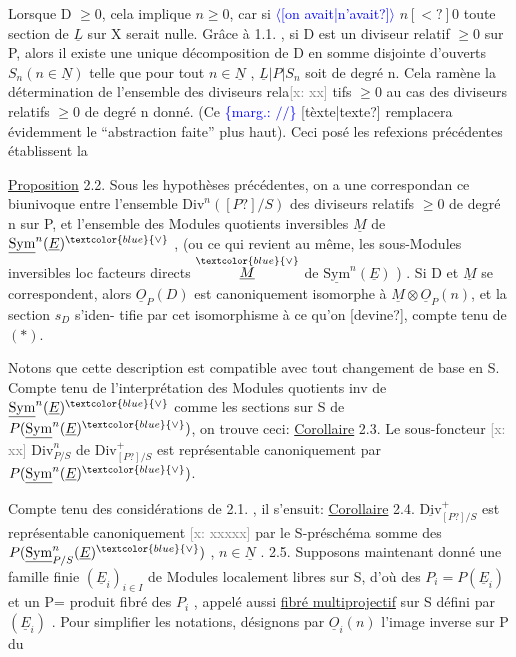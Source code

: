 \documentclass[11pt]{article}
\newcommand{\scanpage}[1]{\par\bigskip\noindent{\small\sffamily[scan #1]}\par}
\newcommand{\mspage}[1]{{\small\sffamily[p.\,#1]}}
\newcommand{\hand}[1]{\textcolor{blue}{#1}}
\newcommand{\inserted}[2][]{\textcolor{blue}{$\langle$#2$\rangle$}}
\newcommand{\margin}[1]{\textcolor{blue}{\{\textsf{marg.:} #1\}}}
\newcommand{\xout}[1]{\textcolor{gray}{[\textsf{x:} #1]}}
\newcommand{\uline}[1]{\underline{#1}}
\newcommand{\unsure}[1]{[#1?]}
\begin{document}
\mspage{106}

\clearpage
\scanpage{25/107}
\mspage{10}

Lorsque D $\geq 0$, cela implique $n \geq 0$, car si \inserted{\unsure{on avait|n'avait}} $n \unsure{<} 0$ toute section de
$\underline{L}$ sur X serait nulle. Grâce à 1.1. , si D est un diviseur relatif
$\geq 0$ sur P, alors il existe une unique décomposition de D en somme
disjointe d'ouverts $S_n (n \in \underline{N})$ telle que pour tout $n \in \underline{N}$ , $\underline{L}|P|S_n$ soit de
degré n. Cela ramène la détermination de l'ensemble des diviseurs rela\xout{xx}%
tifs $\geq 0$ au cas des diviseurs relatifs $\geq 0$ de degré n donné. (Ce
\margin{$/\!/$} \unsure{tèxte|texte} remplacera évidemment le ``abstraction faite'' plus haut). Ceci posé
les refexions précédentes établissent la

\uline{Proposition} 2.2. Sous les hypothèses précédentes, on a une correspondan%
ce biunivoque entre l'ensemble $\mathrm{Div}^{n}(\unsure{P}/S)$ des diviseurs relatifs $\geq 0$ de
degré n sur P, et l'ensemble des Modules quotients inversibles $\underline{M}$ de
$\underline{\mathrm{Sym}}^{n}(\underline{E})^{\hand{\vee}}$ , (ou ce qui revient au même, les sous-Modules inversibles loc
facteurs directs $\overset{\hand{\vee}}{\underline{M}}$ de $\underline{\mathrm{Sym}}^{n}(\underline{E})$ ) . Si D et $\underline{M}$ se correspondent, alors
$\underline{O}_P(D)$ est canoniquement isomorphe à $\underline{M}\otimes\underline{O}_P(n)$, et la section $s_D$ s'iden-%
tifie par cet isomorphisme à ce qu'on \unsure{devine}, compte tenu de $(*)$.

Notons que cette description est compatible avec tout changement de
base en S. Compte tenu de l'interprétation des Modules quotients inv de
$\underline{\mathrm{Sym}}^{n}(\underline{E})^{\hand{\vee}}$ comme les sections sur S de $P(\underline{\mathrm{Sym}}^{n}(\underline{E})^{\hand{\vee}})$, on trouve ceci:
\uline{Corollaire} 2.3. Le sous-foncteur \xout{xx} $\mathrm{Div}^{n}_{P/S}$ de $\mathrm{Div}^{+}_{\unsure{P}/S}$ est représentable
canoniquement par $P(\underline{\mathrm{Sym}}^{n}(\underline{E})^{\hand{\vee}})$.

Compte tenu des considérations de 2.1. , il s'ensuit:
\uline{Corollaire} 2.4. $\underline{\mathrm{Div}}^{+}_{\unsure{P}/S}$ est représentable canoniquement \xout{xxxxx} par
le S-préschéma somme des $P(\underline{\mathrm{Sym}}^{n}_{P/S}(\underline{E})^{\hand{\vee}})$ , $n \in \underline{N}$ .
2.5. Supposons maintenant donné une famille finie $(\underline{E}_i)_{i \in I}$ de Modules
localement libres sur S, d'où des $P_i = P(\underline{E}_i)$ et un P= produit fibré des
$P_i$ , appelé aussi \uline{fibré multiprojectif} sur S défini par $(\underline{E}_i)$ . Pour
simplifier les notations, désignons par $\underline{O}_i(n)$ l'image inverse sur P du
\end{document}
